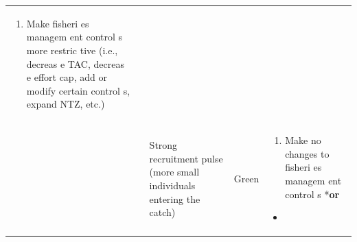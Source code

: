\documentclass[]{book}
\providecommand{\tightlist}{%
  \setlength{\itemsep}{0pt}\setlength{\parskip}{0pt}}
\begin{document}
\begin{longtable}[]{@{}lllll@{}}
\begin{minipage}[t]{0.19\columnwidth}
\begin{enumerate}
\def\labelenumi{\arabic{enumi}.}
\tightlist
\item
  Make fisheri es managem ent control s more restric tive (i.e., decreas
  e TAC, decreas e effort cap, add or modify certain control s, expand
  NTZ, etc.)
\end{enumerate}\strut
\end{minipage}\tabularnewline
\begin{minipage}[t]{0.19\columnwidth}\raggedright\strut
\strut
\end{minipage} & \begin{minipage}[t]{0.19\columnwidth}\raggedright\strut
\strut
\end{minipage} & \begin{minipage}[t]{0.19\columnwidth}\raggedright\strut
Strong recruitment pulse (more small individuals entering the
catch)\strut
\end{minipage} & \begin{minipage}[t]{0.19\columnwidth}\raggedright\strut
Green\strut
\end{minipage} & \begin{minipage}[t]{0.19\columnwidth}\raggedright\strut
\begin{enumerate}
\def\labelenumi{\arabic{enumi}.}
\tightlist
\item
  Make no changes to fisheri es managem ent control s *\textbf{or}
\end{enumerate}

\begin{itemize}
\item
\end{itemize}


\end{minipage}
\end{longtable}
\end{document}
